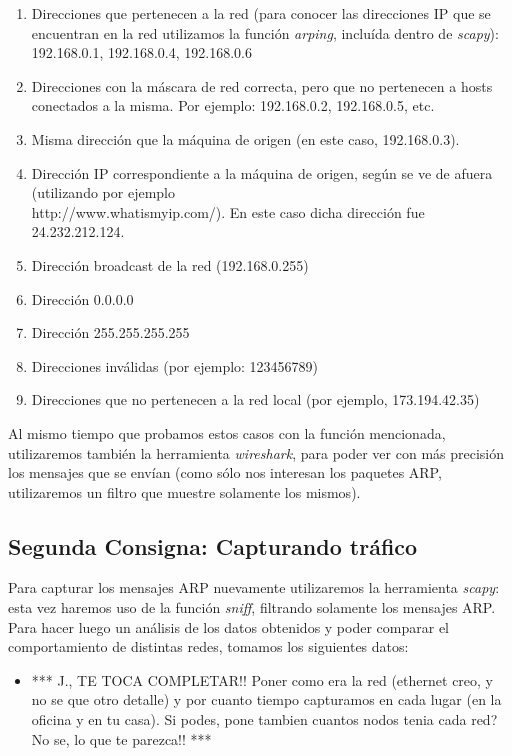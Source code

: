 \begin{enumerate}
 \item Direcciones que pertenecen a la red (para conocer las direcciones IP que se encuentran en la red utilizamos la funci\'on \emph{arping}, inclu\'ida dentro de \emph{scapy}): 192.168.0.1, 192.168.0.4, 192.168.0.6
 \item Direcciones con la m\'ascara de red correcta, pero que no pertenecen a hosts conectados a la misma. Por ejemplo: 192.168.0.2, 192.168.0.5, etc.
 \item Misma direcci\'on que la m\'aquina de origen (en este caso, 192.168.0.3).
 \item Direcci\'on IP correspondiente a la m\'aquina de origen, seg\'un se ve de afuera (utilizando por ejemplo \\ http://www.whatismyip.com/). En este caso dicha direcci\'on fue 24.232.212.124.
 \item Direcci\'on broadcast de la red (192.168.0.255)
 \item Direcci\'on 0.0.0.0
 \item Direcci\'on 255.255.255.255
 \item Direcciones inv\'alidas (por ejemplo: 123456789)
 \item Direcciones que no pertenecen a la red local (por ejemplo, 173.194.42.35)
\end{enumerate}

Al mismo tiempo que probamos estos casos con la funci\'on mencionada, utilizaremos tambi\'en la herramienta \emph{wireshark}, para poder ver con m\'as precisi\'on los mensajes que se env\'ian (como s\'olo nos interesan los paquetes ARP, utilizaremos un filtro que muestre solamente los mismos).

\subsection{Segunda Consigna: Capturando tr\'afico}

Para capturar los mensajes ARP nuevamente utilizaremos la herramienta \emph{scapy}: esta vez haremos uso de la funci\'on \emph{sniff}, filtrando solamente los mensajes ARP. Para hacer luego un an\'alisis de los datos obtenidos y poder comparar el comportamiento de distintas redes, tomamos los siguientes datos:

\begin{itemize}
 \item *** J., TE TOCA COMPLETAR!! Poner como era la red (ethernet creo, y no se que otro detalle) y por cuanto tiempo capturamos en cada lugar (en la oficina y en tu casa). Si podes, pone tambien cuantos nodos tenia cada red? No se, lo que te parezca!! ***
\end{itemize}

